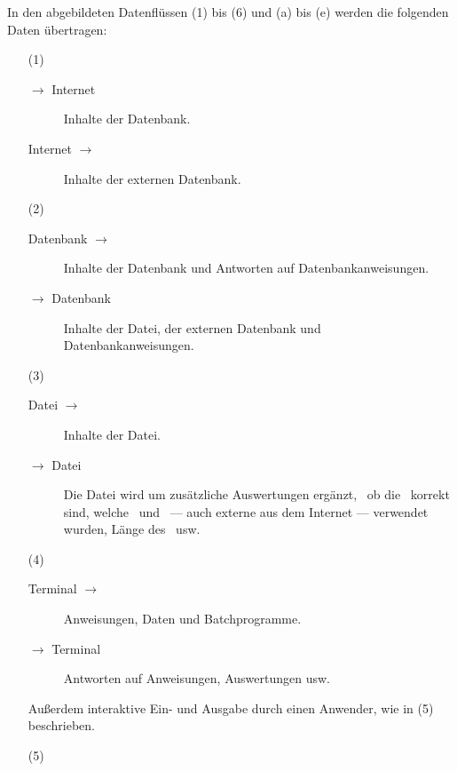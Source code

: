 In den  abgebildeten Datenflüssen (1) bis (6) und (a) bis (e) werden die folgenden Daten übertragen:
\begin{itemize}
	\newcommand*{\vonnach}  [2]{#1 $\rightarrow$ #2}
	\newcommand*{\nachvon}  [2]{\vonnach{#2}{#1}}
	\newcommand*{\hinundher}[2]{#1 $\leftrightarrow$ #2}
	\item[(1)]\label{dat-Internet}
	\begin{description}
		\item[\vonnach{\ASBA}{Internet}]\label{dat-ausInternet}
		Inhalte der Datenbank.
		\item[\nachvon{\ASBA}{Internet}]\label{dat-inInternet}
		Inhalte der externen Datenbank.
	\end{description}
	\item[(2)]\label{dat-Datenbank}
	\begin{description}
		\item[\vonnach{Datenbank}{\ASBA}]\label{dat-ausDatenbank}
		Inhalte der Datenbank und Antworten auf Datenbankanweisungen.
		\item[\nachvon{Datenbank}{\ASBA}]\label{dat-inDatenbank}
		Inhalte der Datei, der externen Datenbank und Datenbankanweisungen.
	\end{description}
	\item[(3)]\label{dat-Datei}
	\begin{description}
		\item[\vonnach{Datei}{\ASBA}]\label{dat-ausDatei}
		Inhalte der Datei.
		\item[\nachvon{Datei}{\ASBA}]\label{dat-inDatei}
		Die Datei wird um zusätzliche Auswertungen ergänzt, \textzB\ ob die \Beweise\ korrekt sind, welche \Axiome\ und \Saetze\ --- auch externe aus dem Internet --- verwendet wurden, Länge des \Beweises\ usw.
	\end{description}
	\item[(4)]\label{dat-Terminal}
	\begin{description}
		\item[\vonnach{Terminal}{\ASBA}]\label{dat-ausTerminal}
		Anweisungen, Daten und Batchprogramme.
		\item[\nachvon{Terminal}{\ASBA}]\label{dat-inTerminal}
		Antworten auf Anweisungen, Auswertungen usw.
	\end{description}
	Außerdem interaktive Ein- und Ausgabe durch einen Anwender, wie in (5) beschrieben.
	\item[(5)]\label{dat-Anwender}
	\begin{description}

\end{description}
\end{itemize}
